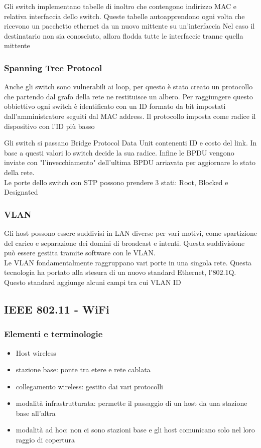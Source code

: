 \documentclass[12pt, a4paper]{article}
\begin{document}
Gli switch implementano tabelle di inoltro che contengono indirizzo MAC e relativa interfaccia dello switch.
Queste tabelle autoapprendono ogni volta che ricevono un pacchetto ethernet da un nuovo mittente su un'interfaccia
Nel caso il destinatario non sia conosciuto, allora flodda tutte le interfaccie tranne quella mittente

\subsubsection{Spanning Tree Protocol}
Anche gli switch sono vulnerabili ai loop, per questo è stato creato un protocollo che partendo dal grafo della 
rete ne restituisce un albero. Per raggiungere questo obbiettivo ogni switch è identificato con un ID 
formato da bit impostati dall'amministratore seguiti dal MAC address. Il protocollo imposta come radice il 
dispositivo con l'ID più basso

Gli switch si passano Bridge Protocol Data Unit contenenti ID e costo del link. In base a questi valori lo 
switch decide la sua radice. Infine le BPDU vengono inviate con "l'invecchiamento" dell'ultima BPDU arriavata
per aggiornare lo stato della rete.\\ Le porte dello switch con STP possono prendere 3 stati: Root, Blocked
e Designated

\subsubsection{VLAN}
Gli host possono essere suddivisi in LAN diverse per vari motivi, come spartizione del carico e separazione dei
domini di broadcast e intenti. Questa suddivisione può essere gestita tramite software con le VLAN.\\
Le VLAN fondamentalmente raggruppano vari porte in una singola rete. Questa tecnologia ha portato alla 
stesura di un nuovo standard Ethernet, l'802.1Q. Questo standard aggiunge alcuni campi tra cui VLAN ID

\subsection{IEEE 802.11 - WiFi}
\subsubsection{Elementi e terminologie}
\begin{itemize}
    \item Host wireless
    \item stazione base: ponte tra etere e rete cablata
    \item collegamento wireless: gestito dai vari protocolli
    \item modalità infrastrutturata: permette il passaggio di un host da una stazione base all'altra
    \item modalità ad hoc: non ci sono stazioni base e gli host comunicano solo nel loro raggio di copertura
\end{itemize}
\end{document}
